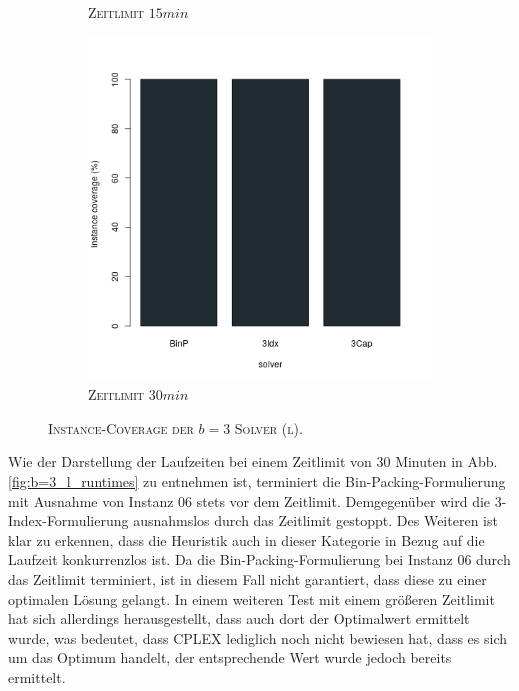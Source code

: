 \begin{figure}[H]
\begin{subfigure}[b]{0.3\textwidth}
\caption{\textsc{Zeitlimit} $15min$}
\label{fig:instance_coverage_b=3_l_b}
\end{subfigure}
\hfill
\begin{subfigure}[b]{0.3\textwidth}
\centering
\includegraphics[width=1.2\textwidth]{img/solver_instance_coverage_b=3_l_1800s.png}
\caption{\textsc{Zeitlimit} $30min$}
\label{fig:instance_coverage_b=3_l_c}
\end{subfigure}
\caption{\textsc{Instance-Coverage der $b = 3$ Solver (l)}.}
\label{}
\end{figure}

Wie der Darstellung der Laufzeiten bei einem Zeitlimit von $30$ Minuten in Abb. \ref{fig:b=3_l_runtimes} zu
entnehmen ist, terminiert die Bin-Packing-Formulierung mit Ausnahme von Instanz $06$ stets vor dem Zeitlimit.
Demgegenüber wird die 3-Index-Formulierung ausnahmslos durch das Zeitlimit gestoppt.
Des Weiteren ist klar zu erkennen, dass die Heuristik auch in dieser Kategorie in Bezug auf die Laufzeit konkurrenzlos ist. Da die Bin-Packing-Formulierung bei Instanz $06$ durch das Zeitlimit terminiert, ist in diesem Fall nicht garantiert, dass diese zu einer optimalen Lösung gelangt. In einem weiteren Test mit einem größeren Zeitlimit hat sich allerdings herausgestellt, dass auch dort der Optimalwert ermittelt wurde, was bedeutet, dass
\textsc{CPLEX} lediglich noch nicht bewiesen hat, dass es sich um das Optimum handelt, der entsprechende Wert wurde jedoch bereits ermittelt.

